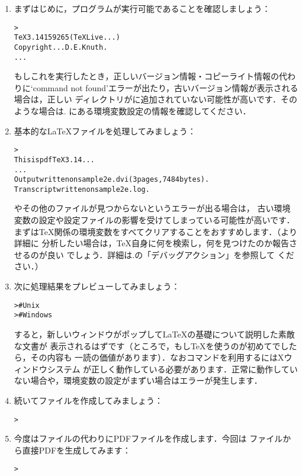 \documentclass[uplatex,dvipdfmx]{jsarticle}
\begin{document}
\begin{enumerate}
\item まずはじめに，プログラムが実行可能であることを確認しましょう：
%
\begin{alltt}
> 
TeX 3.14159265 (TeX Live ...)
Copyright ... D.E. Knuth.
...
\end{alltt}
%
もしこれを実行したとき，正しいバージョン情報・コピーライト情報の代わりに`command
not found'エラーが出たり，古いバージョン情報が表示される場合は，正しい%
ディレクトリがに追加されていない可能性が高いです．そのような場合は\p.%
\pageref{sec:env}にある環境変数設定の情報を確認してください．

\item 基本的な\LaTeX ファイルを処理してみましょう：
%
\begin{alltt}
> 
This is pdfTeX 3.14...
...
Output written on sample2e.dvi (3 pages, 7484 bytes).
Transcript written on sample2e.log.
\end{alltt}
%
やその他のファイルが見つからないというエラーが出る場合は，
古い環境変数の設定や設定ファイルの影響を受けてしまっている可能性が高いです．
まずは\TeX 関係の環境変数をすべてクリアすることをおすすめします．（より詳細に
分析したい場合は，\TeX 自身に何を検索し，何を見つけたのか報告させるのが良い
でしょう．詳細は\p.\pageref{sec:debugging}の「デバッグアクション」を参照して
ください．）

\item 次に処理結果をプレビューしてみましょう：
%
\begin{alltt}
>     # Unix
>   # Windows
\end{alltt}
%
すると，新しいウィンドウがポップして\LaTeX の基礎について説明した素敵な文書が
表示されるはずです（ところで，もし\TeX を使うのが初めてでしたら，その内容も
一読の価値があります）．なおコマンドを利用するにはXウィンドウシステム
が正しく動作している必要があります．正常に動作していない場合や，環境変数の設定がまずい場合はエラーが発生します．

\item 続いて\PS ファイルを作成してみましょう：
%
\begin{alltt}
> 
\end{alltt}

\item 今度は\DVI ファイルの代わりにPDFファイルを作成します．今回は%
ファイルから直接PDFを生成してみます：
%
\begin{alltt}
> 
\end{alltt}


\end{enumerate}
\end{document}
